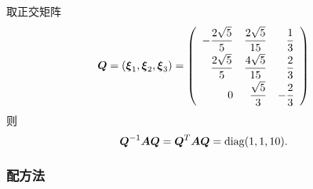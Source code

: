 \begin{frame}
  
    取正交矩阵
    $$
    \boldsymbol{Q}=(\boldsymbol{\xi}_1,\boldsymbol{\xi}_2,\boldsymbol{\xi}_3)=\left(
    \begin{array}{rrr}
      \displaystyle-\frac{2\sqrt{5}}5&\displaystyle\frac{2\sqrt{5}}{15}&\displaystyle\frac13\\[0.2cm]
      \displaystyle \frac{2\sqrt{5}}5&\displaystyle\frac{4\sqrt{5}}{15}&\displaystyle\frac23\\[0.2cm]
      \displaystyle 0&\displaystyle\frac{\sqrt{5}}3&\displaystyle-\frac23
    \end{array}
    \right)
    $$
    则
    $$
    \boldsymbol{Q}^{-1}\boldsymbol{A}\boldsymbol{Q}=\boldsymbol{Q}^{T}\boldsymbol{A}\boldsymbol{Q}=\mathrm{diag}(1,1,10).
    $$ \pause 
  
\end{frame}


\subsubsection{配方法}

\begin{frame}
  \begin{center}
  \end{center}
\end{frame}

